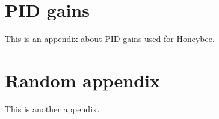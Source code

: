 \chapter{\gls{PID} gains}
\makeatletter{}\makeatother
\label{appen:pid_gains}

This is an appendix about \gls{PID} gains used for Honeybee.

\chapter{Random appendix}
\makeatletter{}\makeatother
\label{appen:random}

This is another appendix.

